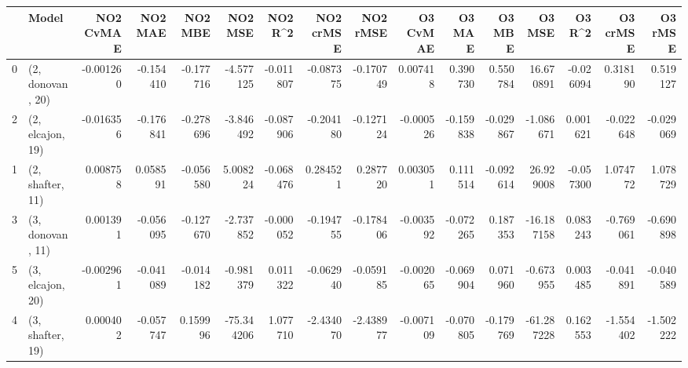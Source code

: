 \begin{tabular}{llrrrrrrrrrrrrrr}
\toprule
{} &             Model &  NO2 CvMAE &   NO2 MAE &   NO2 MBE &    NO2 MSE &   NO2 R\textasciicircum2 &  NO2 crMSE &  NO2 rMSE &  O3 CvMAE &    O3 MAE &    O3 MBE &     O3 MSE &    O3 R\textasciicircum2 &  O3 crMSE &   O3 rMSE \\
\midrule
0 &  (2, donovan, 20) &  -0.001260 & -0.154410 & -0.177716 &  -4.577125 & -0.011807 &  -0.087375 & -0.170749 &  0.007418 &  0.390730 &  0.550784 &  16.670891 & -0.026094 &  0.318190 &  0.519127 \\
2 &  (2, elcajon, 19) &  -0.016356 & -0.176841 & -0.278696 &  -3.846492 & -0.087906 &  -0.204180 & -0.127124 & -0.000526 & -0.159838 & -0.029867 &  -1.086671 &  0.001621 & -0.022648 & -0.029069 \\
1 &  (2, shafter, 11) &   0.008758 &  0.058591 & -0.056580 &   5.008224 & -0.068476 &   0.284521 &  0.287720 &  0.003051 &  0.111514 & -0.092614 &  26.929008 & -0.057300 &  1.074772 &  1.078729 \\
3 &  (3, donovan, 11) &   0.001391 & -0.056095 & -0.127670 &  -2.737852 & -0.000052 &  -0.194755 & -0.178406 & -0.003592 & -0.072265 &  0.187353 & -16.187158 &  0.083243 & -0.769061 & -0.690898 \\
5 &  (3, elcajon, 20) &  -0.002961 & -0.041089 & -0.014182 &  -0.981379 &  0.011322 &  -0.062940 & -0.059185 & -0.002065 & -0.069904 &  0.071960 &  -0.673955 &  0.003485 & -0.041891 & -0.040589 \\
4 &  (3, shafter, 19) &   0.000402 & -0.057747 &  0.159996 & -75.344206 &  1.077710 &  -2.434070 & -2.438977 & -0.007109 & -0.070805 & -0.179769 & -61.287228 &  0.162553 & -1.554402 & -1.502222 \\
\bottomrule
\end{tabular}
